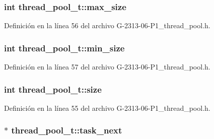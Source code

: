 \subsubsection[{\texorpdfstring{max\+\_\+size}{max_size}}]{\setlength{\rightskip}{0pt plus 5cm}int thread\+\_\+pool\+\_\+t\+::max\+\_\+size}\hypertarget{structthread__pool__t_a978e7f94032dad6e7a373e7bc1896237}{}\label{structthread__pool__t_a978e7f94032dad6e7a373e7bc1896237}


Definición en la línea 56 del archivo G-\/2313-\/06-\/\+P1\+\_\+thread\+\_\+pool.\+h.

\subsubsection[{\texorpdfstring{min\+\_\+size}{min_size}}]{\setlength{\rightskip}{0pt plus 5cm}int thread\+\_\+pool\+\_\+t\+::min\+\_\+size}\hypertarget{structthread__pool__t_a80aa1805a11e2e6e2bf5811fda0ffc26}{}\label{structthread__pool__t_a80aa1805a11e2e6e2bf5811fda0ffc26}


Definición en la línea 57 del archivo G-\/2313-\/06-\/\+P1\+\_\+thread\+\_\+pool.\+h.

\subsubsection[{\texorpdfstring{size}{size}}]{\setlength{\rightskip}{0pt plus 5cm}int thread\+\_\+pool\+\_\+t\+::size}\hypertarget{structthread__pool__t_a3185c157636a142415699a20042d6dd8}{}\label{structthread__pool__t_a3185c157636a142415699a20042d6dd8}


Definición en la línea 55 del archivo G-\/2313-\/06-\/\+P1\+\_\+thread\+\_\+pool.\+h.

\subsubsection[{\texorpdfstring{task\+\_\+next}{task_next}}]{$\ast$ thread\+\_\+pool\+\_\+t\+::task\+\_\+next}\hypertarget{structthread__pool__t_a00ce5a27204f85e624552f7448ba7093}{}\label{structthread__pool__t_a00ce5a27204f85e624552f7448ba7093}


